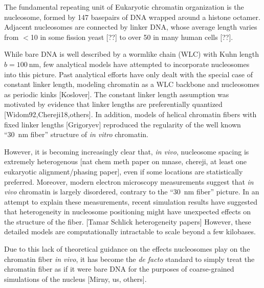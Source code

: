 \documentclass[%
 reprint,
superscriptaddress,
showpacs,preprintnumbers,
 amsmath,amssymb,
 aps,
 prl,
]{revtex4-1}
\begin{document}
The fundamental repeating unit of Eukaryotic chromatin organization is the
    nucleosome, formed by 147 basepairs of DNA wrapped around a histone octamer.
Adjacent nucleosomes are connected by linker DNA, whose average length varies from
    $<$\SI{10}{\basepair} in some fission yeast [??] to over \SI{50}{\basepair} in
    many human cells [??].

While bare DNA is well described by a wormlike chain (WLC) with Kuhn length
    {$b = \SI{100}{\nano\metre}$}, few analytical models have attempted to
    incorporate nucleosomes into this picture.
Past analytical efforts have only dealt with the special
    case of constant linker length, modeling chromatin as a WLC backbone and
    nucleosomes as periodic kinks [Koslover].
The constant linker length assumption was motivated by evidence
    that linker lengths are preferentially quantized [Widom92,Chereji18,others].
In addition, models of helical chromatin fibers with fixed linker lengths [Grigoryev] reproduced the regularity of the
    well known ``\SI{30}{\nano\metre} fiber'' structure of \textit{in vitro}
    chromatin.

However, it is becoming increasingly clear that, \textit{in vivo}, nucleosome
    spacing is extremely heterogenous [nat chem meth paper on mnase, chereji, at
    least one eukaryotic alignment/phasing paper], even if some locations are
    statistically preferred.
Moreover, modern electron microscopy measurements suggest that \textit{in vivo} chromatin
    is largely disordered, contrary to the ``\SI{30}{\nano\metre} fiber''
    picture.
In an attempt to explain these measurements, recent simulation results have suggested that heterogeneity in
    nucleosome positioning might have unexpected effects on the structure of the
    fiber. [Tamar Schlick heterogeneity papers] However, these detailed models are computationally intractable to scale beyond a few kilobases.

Due to this lack of theoretical guidance on the effects nucleosomes play on the
    chromatin fiber \textit{in vivo}, it has become the \textit{de facto}
    standard to simply treat the chromatin fiber as if it were bare DNA for
    the purposes of coarse-grained simulations of the nucleus [Mirny, us,
    others].
\end{document}
